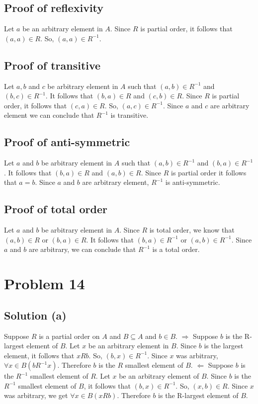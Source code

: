 \documentclass{article}
\begin{document}
\subsection{Proof of reflexivity}
Let $a$ be an arbitrary element in $A$. Since $R$ is partial order, it
follows that $(a,a) \in R$. So, $(a,a) \in R^{-1}$.
\subsection{Proof of transitive}
Let $a,b$ and $c$ be arbitrary element in $A$ such that $(a,b) \in
R^{-1}$ and $(b,c) \in R^{-1}$. It follows that $(b,a) \in R$ and
$(c,b) \in R$. Since $R$ is partial order, it follows that $(c,a) \in
R$. So, $(a,c) \in R^{-1}$. Since $a$ and $c$ are arbitrary element we
can conclude that $R^{-1}$ is transitive.
\subsection{Proof of anti-symmetric}
Let $a$ and $b$ be arbitrary element in $A$ such that $(a,b) \in
R^{-1}$ and $(b,a) \in R^{-1}$. It follows that $(b,a) \in R$ and
$(a,b) \in R$. Since $R$ is partial order it follows that $a = b$.
Since $a$ and $b$ are arbitrary element, $R^{-1}$ is anti-symmetric.
\subsection{Proof of total order}
Let $a$ and $b$ be arbitrary element in $A$. Since $R$ is total order,
we know that $(a,b) \in R$ or $(b,a) \in R$. It follows that $(b,a)
\in R^{-1}$ or $(a,b) \in R^{-1}$. Since $a$ and $b$ are arbitrary, we
can conclude that $R^{-1}$ is a total order.

\section{Problem 14}
\subsection{Solution (a)}
Suppose $R$ is a partial order on $A$ and $B \subseteq A$ and $b \in
B$.
$\Rightarrow$ Suppose $b$ is the R-largest element of $B$. Let $x$ be
an arbitrary element in $B$. Since $b$ is the largest element, it
follows that $xRb$. So, $(b,x) \in R^{-1}$. Since $x$ was arbitrary,
$\forall x \in B(b R^{-1} x)$. Therefore $b$ is the $R$ smallest
element of $B$.
$\Leftarrow$ Suppose $b$ is the $R^{-1}$ smallest element of $R$. Let
$x$ be an arbitrary element of $B$. Since $b$ is the $R^{-1}$ smallest
element of $B$, it follows that $(b,x) \in R^{-1}$. So, $(x,b) \in R$.
Since $x$ was arbitrary, we get $\forall x \in B(xRb)$. Therefore $b$
is the R-largest element of $B$.
\end{document}
